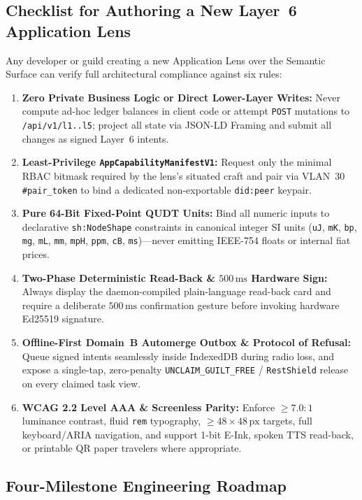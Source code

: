 \subsection{Checklist for Authoring a New Layer~6 Application Lens}

Any developer or guild creating a new Application Lens over the Semantic Surface can verify full architectural compliance against six rules:
\begin{enumerate}
    \item \textbf{Zero Private Business Logic or Direct Lower-Layer Writes:} Never compute ad-hoc ledger balances in client code or attempt \texttt{POST} mutations to \texttt{/api/v1/l1..l5}; project all state via JSON-LD Framing and submit all changes as signed Layer~6 intents.
    \item \textbf{Least-Privilege \texttt{AppCapabilityManifestV1}:} Request only the minimal RBAC bitmask required by the lens's situated craft and pair via VLAN~30 \texttt{\#pair\_token} to bind a dedicated non-exportable \texttt{did:peer} keypair.
    \item \textbf{Pure 64-Bit Fixed-Point QUDT Units:} Bind all numeric inputs to declarative \texttt{sh:NodeShape} constraints in canonical integer SI units (\texttt{uJ}, \texttt{mK}, \texttt{bp}, \texttt{mg}, \texttt{mL}, \texttt{mm}, \texttt{mpH}, \texttt{ppm}, \texttt{cB}, \texttt{ms})---never emitting IEEE-754 floats or internal fiat prices.
    \item \textbf{Two-Phase Deterministic Read-Back \& $500\,\mathrm{ms}$ Hardware Sign:} Always display the daemon-compiled plain-language read-back card and require a deliberate $500\,\mathrm{ms}$ confirmation gesture before invoking hardware Ed25519 signature.
    \item \textbf{Offline-First Domain~B Automerge Outbox \& Protocol of Refusal:} Queue signed intents seamlessly inside IndexedDB during radio loss, and expose a single-tap, zero-penalty \texttt{UNCLAIM\_GUILT\_FREE} / \texttt{RestShield} release on every claimed task view.
    \item \textbf{WCAG 2.2 Level AAA \& Screenless Parity:} Enforce $\ge 7.0:1$ luminance contrast, fluid \texttt{rem} typography, $\ge 48 \times 48\,\mathrm{px}$ targets, full keyboard/ARIA navigation, and support 1-bit E-Ink, spoken TTS read-back, or printable QR paper travelers where appropriate.
\end{enumerate}

\subsection{Four-Milestone Engineering Roadmap}

